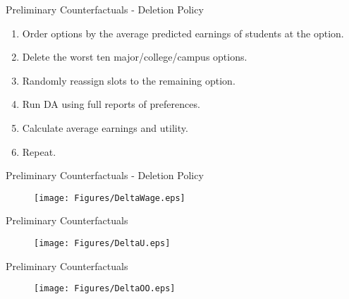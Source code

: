 \documentclass[table,10pt]{beamer}
\begin{document}
\begin{frame}{Preliminary Counterfactuals - Deletion Policy}

\medskip


\bigskip 
{} 
\begin{enumerate}
  \item<4> Order options by the average predicted earnings of students at the option. 
  \item<5> Delete the worst ten major/college/campus options.
  \item<6> Randomly reassign slots to the remaining option. 
  \item<7> Run DA using full reports of preferences. 
  \item<8> Calculate average earnings and utility. 
  \item<9> Repeat. 
\end{enumerate} 

\end{frame}

\begin{frame}{Preliminary Counterfactuals - Deletion Policy}

\begin{figure}
  \centering
  \texttt{[image: Figures/DeltaWage.eps]}
\end{figure}

\end{frame}

\begin{frame}{Preliminary Counterfactuals}

\begin{figure}
  \centering
  \texttt{[image: Figures/DeltaU.eps]}
\end{figure}

\end{frame}

\begin{frame}{Preliminary Counterfactuals}

\begin{figure}
  \centering
  \texttt{[image: Figures/DeltaOO.eps]}
\end{figure}

\end{frame}
\end{document}
